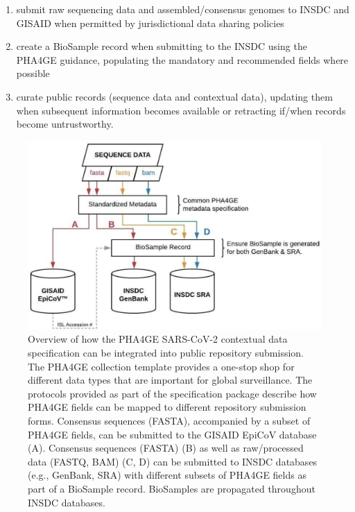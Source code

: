 \begin{enumerate}
    \item submit raw sequencing data and assembled/consensus genomes to INSDC and GISAID when permitted by jurisdictional data sharing policies
    \item create a BioSample record when submitting to the INSDC using the PHA4GE guidance, populating the mandatory and recommended fields where possible
    \item curate public records (sequence data and contextual data), updating them when subsequent information becomes available or retracting if/when records become untrustworthy. 
\end{enumerate}

\begin{figure}[h!]
\centering
\includegraphics[width=\textwidth]{figures/chapter 7/giac003fig3.jpeg}
\caption{Overview of how the PHA4GE SARS-CoV-2 contextual data specification can be integrated into public repository submission. The PHA4GE collection template provides a one-stop shop for different data types that are important for global surveillance. The protocols provided as part of the specification package describe how PHA4GE fields can be mapped to different repository submission forms. Consensus sequences (FASTA), accompanied by a subset of PHA4GE fields, can be submitted to the GISAID EpiCoV database (A). Consensus sequences (FASTA) (B) as well as raw/processed data (FASTQ, BAM) (C, D) can be submitted to INSDC databases (e.g., GenBank, SRA) with different subsets of PHA4GE fields as part of a BioSample record. BioSamples are propagated throughout INSDC databases.}
\label{fig:chap7_figure_3}
\end{figure}

